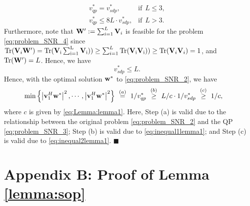 \documentclass[11pt, draft, onecolumn ]{IEEEtran}
\begin{document}
\begin{equation}  \label{eq:inequal1lemma1}
    \begin{array}{ll}
    v_{qp}^* = v_{sdp}^*, & \mathrm{if} ~~ L \leq 3, \\
    v_{qp}^* \leq 8L \cdot v_{sdp}^*, &  \mathrm{if} ~~ L > 3.
    \end{array}
\end{equation}
Furthermore, note that ${\bf W}' := \sum_{i=1}^L {\bf V}_i$ is feasible
 for the problem \eqref{eq:problem_SNR_4} since $\mathrm{Tr}({\bf V}_i {\bf W}') = \mathrm{Tr({\bf V}_i\sum_{i=1}^L {\bf V}_i)})  \ge \sum_{i=1}^L \mathrm{Tr({\bf V}_i {\bf V}_i)})\geq \mathrm{Tr}({\bf V}_i {\bf V}_i) = 1  $,
and $\mathrm{Tr}({\bf W}') = L$. Hence, we have
\begin{equation}  \label{eq:inequal2lemma1}
    v_{sdp}^* \leq L.
\end{equation}
Hence, with  the optimal solution ${\bf w}^*$  to \eqref{eq:problem_SNR_2}, we have
\begin{align}
     \min{\left\{ \left| {\bf v}_1^H {\bf w}^*\right|^2, \cdots, \left| {\bf v}_1^H {\bf w}^*\right|^2\right\}} ~&\stackrel{(a)}{=}~  1/v_{qp}^*   ~\stackrel{(b)}{\ge}~ L/c \cdot 1/v_{sdp}^* ~\stackrel{(c)}{\ge}~  1/c, \label{eq:lemma1_last3}
\end{align}
where $c$ is given by \eqref{eq:Lemma:lemma1}.
Here,   Step (a)  is valid due to the relationship between the original problem
\eqref{eq:problem_SNR_2} and the QP \eqref{eq:problem_SNR_3};   Step (b)  is valid due to \eqref{eq:inequal1lemma1}; and   Step (c) is valid due to \eqref{eq:inequal2lemma1}.
\hfill{$\blacksquare$}





\section*{Appendix B:  Proof of Lemma \ref{lemma:sop}}
\end{document}
